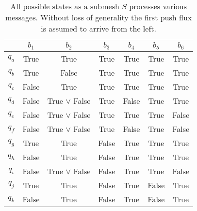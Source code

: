 \begin{table}
\caption{All possible states as a submesh $S$ processes various messages. Without loss of generality the first push flux is assumed to arrive from the left.}
\label{tab:firstmsg}
\centering
\begin{tabular}{|c||c|c|c|c|c|c|}
\hline
& $b_1$ & $b_2$ & $b_3$ & $b_4$ & $b_5$ & $b_6$\\ \hline\hline
$q_a$ & True & True & True & True & True & True \\ \hline
$q_b$ & True & False & True & True & True & True \\ \hline
$q_c$ & False & True & True & True & True & True \\ \hline
$q_d$ & False & True $\lor$ False & True & False & True & True\\ \hline
$q_e$ & False & True $\lor$ False & True & True & True & False\\ \hline
$q_f$ & False & True $\lor$ False & True & False & True & False\\ \hline
$q_g$ & True & True & False & True & True & True\\ \hline
$q_h$ & False & True & False & True & True & True \\ \hline
$q_i$ & False & True $\lor$ False & False & True & True & False \\ \hline
$q_j$ & True & True & False & True & False & True \\ \hline
$q_k$ & False & True & False & True & False & True \\ \hline
\end{tabular}
\end{table}

